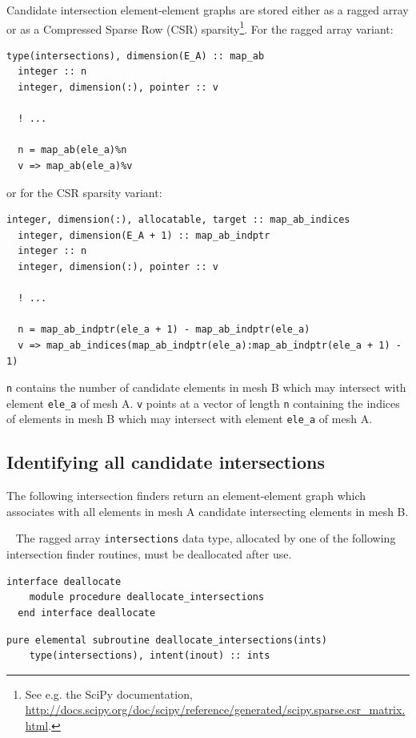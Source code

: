 \documentclass{article}
\begin{document}
Candidate intersection element-element graphs are stored either as a ragged
array or as a Compressed Sparse Row (CSR) sparsity\footnote{See e.g. the SciPy
documentation,
\url{http://docs.scipy.org/doc/scipy/reference/generated/scipy.sparse.csr_matrix.html}.}.
For the ragged array variant:
\begin{lstlisting}[language=FORTRAN]
  type(intersections), dimension(E_A) :: map_ab
  integer :: n
  integer, dimension(:), pointer :: v
  
  ! ...

  n = map_ab(ele_a)%n
  v => map_ab(ele_a)%v
\end{lstlisting}
or for the CSR sparsity variant:
\begin{lstlisting}[language=FORTRAN]
  integer, dimension(:), allocatable, target :: map_ab_indices
  integer, dimension(E_A + 1) :: map_ab_indptr
  integer :: n
  integer, dimension(:), pointer :: v
  
  ! ...

  n = map_ab_indptr(ele_a + 1) - map_ab_indptr(ele_a)
  v => map_ab_indices(map_ab_indptr(ele_a):map_ab_indptr(ele_a + 1) - 1)
\end{lstlisting}
\verb+n+ contains the number of candidate elements in mesh B which may intersect
with element \verb+ele_a+ of mesh A. \verb+v+ points at a vector of length
\verb+n+ containing the indices of elements in mesh B which may intersect with
element \verb+ele_a+ of mesh A.

\subsection{Identifying all candidate intersections}

The following intersection finders return an element-element graph which
associates with all elements in mesh A candidate intersecting elements in mesh
B. 

~\newline
The ragged array \verb+intersections+ data type, allocated by one of the
following intersection finder routines, must be deallocated after use.

\begin{lstlisting}[language=FORTRAN]
  interface deallocate
    module procedure deallocate_intersections
  end interface deallocate
\end{lstlisting}

\begin{lstlisting}[language=FORTRAN]
  pure elemental subroutine deallocate_intersections(ints)
    type(intersections), intent(inout) :: ints
\end{lstlisting}
\end{document}
